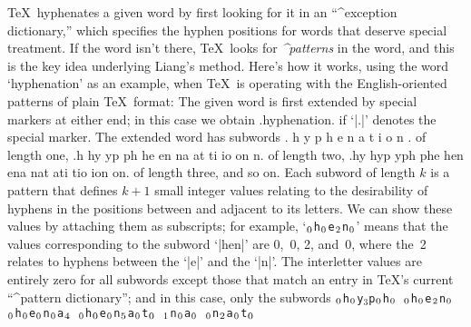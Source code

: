 \def\\#1{$_{\kern\scriptspace#1}$}
\TeX\ hyphenates a given word by first looking for it in an ``^{exception
dictionary},'' which specifies the hyphen positions for words that deserve
special treatment. If the word isn't there, \TeX\ looks for {\sl^{patterns}\/}
in the word, and this is the key idea underlying Liang's method. Here's how
it works, using the word `hyphenation' as an example, when \TeX\ is
operating with the English-oriented patterns of plain \TeX\ format:
The given word is first extended by special markers at either end; in this
case we obtain
\begintt
.hyphenation.
\endtt
if `|.|' denotes the special marker. The extended word has subwords
\begintt
. h y p h e n a t i o n .
\endtt
of length one,
\begintt
.h hy yp ph he en na at ti io on n.
\endtt
of length two,
\begintt
.hy hyp yph phe hen ena nat ati tio ion on.
\endtt
of length three,
and so on. Each subword of length $k$ is a pattern that defines $k+1$ small
integer values relating to the desirability of hyphens in the positions
between and adjacent to its letters. We can show these values by attaching
them as subscripts; for example,
`{\tt\\0h\\0e\\2n\\0}' means that the values corresponding to the
subword `|hen|' are 0,~0, 2, and~0, where the~2 relates to hyphens
between the `|e|' and the `|n|'. The interletter values are entirely zero
for all subwords except those that match an entry in \TeX's current
``^{pattern dictionary}''; and in this case, only the subwords
\begindisplay
\tt\\0h\\0y$_3$p\\0h\\0 \\0h\\0e\\2n\\0 \\0h\\0e\\0n\\0a\\4\cr
\qquad\tt\\0h\\0e\\0n\\5a\\0t\\0 \\1n\\0a\\0 \\0n\\2a\\0t\\0
